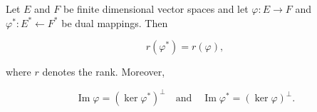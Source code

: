 Let $E$ and $F$ be finite dimensional vector spaces and let $\varphi: E \rightarrow F$ and $\varphi^*: E^* \leftarrow F^*$ be dual mappings. Then

$$r(\varphi^*) = r(\varphi),$$

where $r$ denotes the rank. Moreover,

$$\operatorname{Im} \varphi = (\ker \varphi^*)^\perp \quad \text{and} \quad \operatorname{Im} \varphi^* = (\ker \varphi)^\perp.$$
